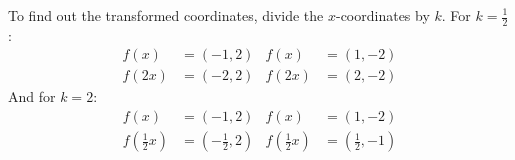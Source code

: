 To find out the transformed coordinates, divide the $x$-coordinates by $k$. For $k=\frac{1}{2}$:
\begin{align*}
f(x)&=(-1,2) & f(x)&=(1,-2)\\
f(2x)&=(-2,2) & f(2x)&=(2,-2)
\end{align*}
And for $k=2$:
\begin{align*}
f(x)&=(-1,2) & f(x)&=(1,-2)\\
f\left(\frac{1}{2}x\right)&=\left(-\frac{1}{2},2\right) & f\left(\frac{1}{2}x\right)&=\left(\frac{1}{2},-1\right)
\end{align*}